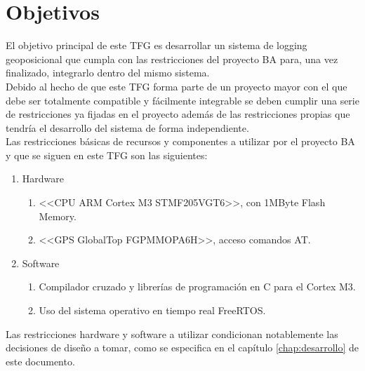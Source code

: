 \chapter{Objetivos}
\label{chap:objetivos}

El objetivo principal de este \acs{TFG} es desarrollar un sistema de logging geoposicional que cumpla con las restricciones del proyecto \acs{BA} para, una vez finalizado, integrarlo dentro del mismo sistema.\\

Debido al hecho de que este \acs{TFG} forma parte de un proyecto mayor con el que debe ser totalmente compatible y fácilmente integrable se deben cumplir una serie de restricciones ya fijadas en el proyecto además de las restricciones propias que tendría el desarrollo del sistema de forma independiente.\\

Las restricciones básicas de recursos y componentes a utilizar por el proyecto \acs{BA} y que se siguen en este \acs{TFG} son las siguientes:
\begin{enumerate}
\item Hardware
  \begin{enumerate}
  \item <<CPU ARM Cortex M3 STMF205VGT6>>, con 1MByte Flash Memory.
  \item <<GPS GlobalTop FGPMMOPA6H>>, acceso comandos AT.\\
  \end{enumerate}
\item Software
  \begin{enumerate}
  \item Compilador cruzado y librerías de programación en C para el Cortex M3.
  \item Uso del sistema operativo en tiempo real FreeRTOS.\\
  \end{enumerate}
\end{enumerate}

Las restricciones hardware y software a utilizar condicionan notablemente las decisiones de diseño a tomar, como se especifica en el capítulo \ref{chap:desarrollo} de este documento.\\

